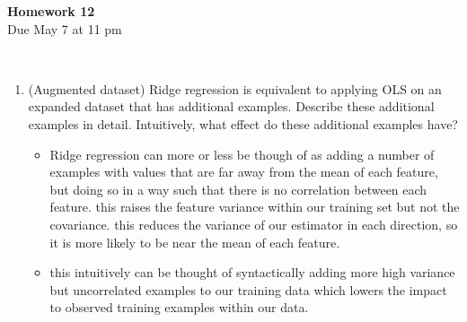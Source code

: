 \documentclass[12pt,twoside]{article}
\begin{document}
\begin{center}
{\large{\textbf{Homework 12}} } \vspace{0.2cm}\\
Due May 7 at 11 pm
\\
\end{center}
\\

\begin{enumerate}

 \item (Augmented dataset) Ridge regression is equivalent to applying OLS on an expanded dataset that has additional examples. Describe these additional examples in detail. Intuitively, what effect do these additional examples have?

 \begin{itemize}
     \color{blue}
     \item Ridge regression can more or less be though of as adding a number of examples with values that are far away from the mean of each feature, but doing so in a way such that there is no correlation between each feature. this raises the feature variance within our training set but not the covariance. this reduces the variance of our estimator in each direction, so it is more likely to be near the mean of each feature. 
     \item this intuitively can be thought of syntactically adding more high variance but uncorrelated examples to our training data which lowers the impact to observed training examples within our data.
     \end{itemize}


\end{enumerate}
\end{document}
